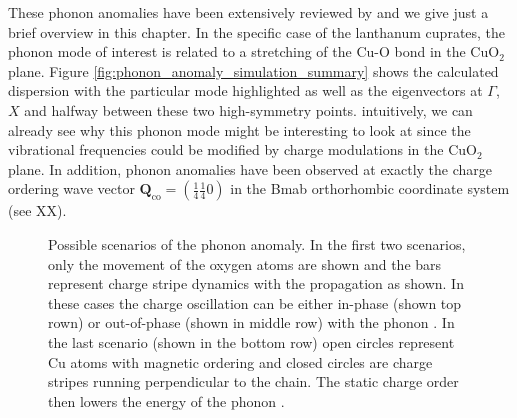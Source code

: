 These phonon anomalies have been extensively reviewed by \citeauthor{Reznik2012} \cite{Reznik2012} and we give just a brief overview in this chapter. In the specific case of the lanthanum cuprates, the phonon mode of interest is related to a stretching of the Cu-O bond in the CuO$_2$ plane. Figure \ref{fig:phonon_anomaly_simulation_summary} shows the calculated dispersion with the particular mode highlighted as well as the eigenvectors at $\Gamma$, $X$ and halfway between these two high-symmetry points. intuitively, we can already see why this phonon mode might be interesting to look at since the vibrational frequencies could be modified by charge modulations in the CuO$_2$ plane. In addition, phonon anomalies have been observed at exactly the charge ordering wave vector $\bm{Q}_\text{co} = \left( \frac{1}{4} \frac{1}{4} 0 \right)$ in the Bmab orthorhombic coordinate system (see XX). 

\begin{figure}
    \centering
    \caption[1D phonon anomaly sketch]{Possible scenarios of the phonon anomaly. In the first two scenarios, only the movement of the oxygen atoms are shown and the bars represent charge stripe dynamics with the propagation as shown. In these cases the charge oscillation can be either in-phase (shown top rown) or out-of-phase (shown in middle row) with the phonon \cite{Kaneshita2002}. In the last scenario (shown in the bottom row) open circles represent Cu atoms with magnetic ordering and closed circles are charge stripes running perpendicular to the chain. The static charge order then lowers the energy of the phonon \cite{Reznik2006}.}
    \label{fig:anomaly_1d}
\end{figure}

%     


